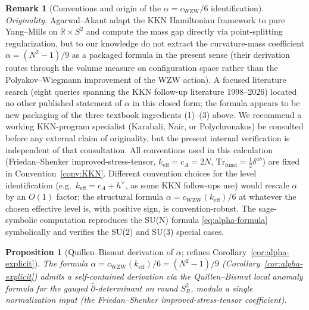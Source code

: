 \documentclass[11pt,letterpaper]{article}
\newtheorem{proposition}[theorem]{Proposition}
\theoremstyle{definition}
\newtheorem{remark}[theorem]{Remark}
\newcommand{\bbR}{\mathbb{R}}
\newcommand{\Tr}{\mathrm{Tr}}
\begin{document}
\begin{remark}[Conventions and origin of the $\alpha = c_{\mathrm{WZW}}/6$ identification]
\smallskip
\noindent\emph{Originality.} Agarwal--Akant \cite{AgarwalAkant2008} adapt the KKN Hamiltonian framework to pure Yang--Mills on $\bbR\times S^2$ and compute the mass gap directly via point-splitting regularization, but to our knowledge do not extract the curvature-mass coefficient $\alpha = (N^2-1)/9$ as a packaged formula in the present sense (their derivation routes through the volume measure on configuration space rather than the Polyakov--Wiegmann improvement of the WZW action). A focused literature search (eight queries spanning the KKN follow-up literature 1998--2026) located no other published statement of $\alpha$ in this closed form; the formula appears to be new packaging of the three textbook ingredients (1)--(3) above. We recommend a working KKN-program specialist (Karabali, Nair, or Polychronakos) be consulted before any external claim of originality, but the present internal verification is independent of that consultation.
All conventions used in this calculation (Friedan--Shenker improved-stress-tensor, $k_{\mathrm{eff}} = c_A = 2N$, $\Tr_{\mathrm{fund}} = \tfrac{1}{2}\delta^{ab}$) are fixed in Convention~\ref{conv:KKN}. Different convention choices for the level identification (e.g.\ $k_{\mathrm{eff}} = c_A + h^\vee$, as some KKN follow-ups use) would rescale $\alpha$ by an $O(1)$ factor; the structural formula $\alpha = c_{\mathrm{WZW}}(k_{\mathrm{eff}})/6$ at whatever the chosen effective level is, with positive sign, is convention-robust. The sage-symbolic computation \cite{alpha-PW-S2-script} reproduces the SU(N) formula \eqref{eq:alpha-formula} symbolically and verifies the SU(2) and SU(3) special cases.
\end{remark}

\begin{proposition}[Quillen--Bismut derivation of $\alpha$; refines Corollary~\ref{cor:alpha-explicit}]\label{prop:alpha-QB}
The formula $\alpha = c_{\mathrm{WZW}}(k_{\mathrm{eff}})/6 = (N^2-1)/9$ (Corollary~\ref{cor:alpha-explicit}) admits a self-contained derivation via the Quillen--Bismut local anomaly formula \cite{Quillen1985, BismutGilletSoule1988} for the gauged $\bar\partial$-determinant on round $S^2_R$, modulo a single normalization input (the Friedan--Shenker improved-stress-tensor coefficient).
\end{proposition}
\end{document}
